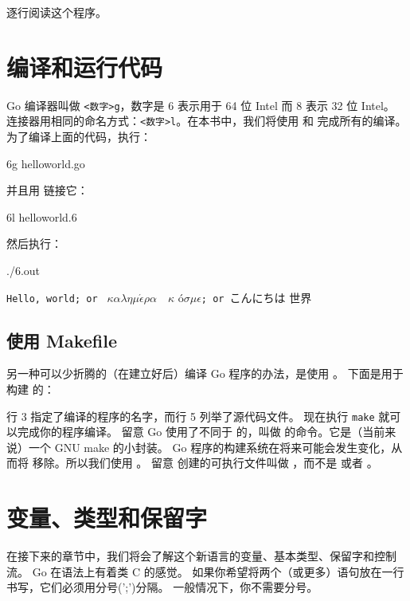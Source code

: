 
逐行阅读这个程序。
\showremarks

\section{编译和运行代码}
Go 编译器叫做 \verb|<数字>g|，数字是 6 表示用于 64 位 Intel 而 8 表示 32 位 Intel。
连接器用相同的命名方式：\verb|<数字>l|。在本书中，我们将使用  和  完成所有的编译。
为了编译上面的代码，执行：
\begin{display}
\pr 6g helloworld.go
\end{display}
并且用  链接它：
\begin{display}
\pr 6l helloworld.6
\end{display}

然后执行：
\begin{display}
    \pr ./6.out	    
\end{display}
\vspace{-3.0ex}
\texttt{Hello, world; or }%
\begin{math}\kappa\alpha\lambda\eta\mu\acute{\epsilon}\rho\alpha\hspace{1em}\kappa\end{math}%
\'o\begin{math} \sigma\mu\epsilon\end{math}\texttt{; or }こんにちは 世界
\ \newline
\ \newline

\subsection{使用 Makefile}
\label{sec:building a program}
另一种可以少折腾的（在建立好后）编译 Go 程序的办法，是使用 。
下面是用于构建 的：

行 3 指定了编译的程序的名字，而行 5 列举了源代码文件。
现在执行 \verb|make| 就可以完成你的程序编译。
留意 Go 使用了不同于  的，叫做  的命令。它是（当前来说）一个 GNU make 的小封装。
Go 程序的构建系统在将来可能会发生变化，从而将  移除。所以我们使用 。
留意  创建的可执行文件叫做 ，而不是  或者 。

\section{变量、类型和保留字}
\label{sec:vars}
在接下来的章节中，我们将会了解这个新语言的变量、基本类型、保留字和控制流。
Go 在语法上有着类 C 的感觉。
如果你希望将两个（或更多）语句放在一行书写，它们必须用分号(';')分隔。
一般情况下，你不需要分号。

